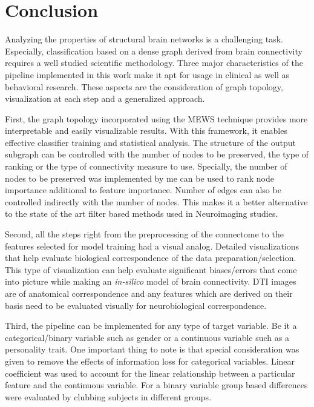 \documentclass[msthesis.tex]{subfiles}
\begin{document}
\chapter{Conclusion}
\iffalse
Interpretability-accuracy tradeoff. 
With the solver - 42 features (10 nodes)
with the baseline - much more number of nodes for the same features.
\fi
Analyzing the properties of structural brain networks is a challenging task. Especially, classification based on a dense graph derived from brain connectivity requires a well studied scientific methodology. Three major characteristics of the pipeline implemented in this work make it apt for usage in clinical as well as behavioral research. These aspects are the consideration of graph topology, visualization at each step and a generalized approach. 

First, the graph topology incorporated using the MEWS technique provides more interpretable and easily visualizable results. With this framework, it enables effective classifier training and statistical analysis. The structure of the output subgraph can be controlled with the number of nodes to be preserved, the type of ranking or the type of connectivity measure to use. Specially, the number of nodes to be preserved was implemented by me can be used to rank node importance additional to feature importance. Number of edges can also be controlled indirectly with the number of nodes. This makes it a better alternative to the state of the art filter based methods used in Neuroimaging studies. 

Second, all the steps right from the preprocessing of the connectome to the features selected for model training had a visual analog. Detailed visualizations that help evaluate biological correspondence of the data preparation/selection. This type of visualization can help evaluate significant biases/errors that come into picture while making an \textit{in-silico} model of brain connectivity. DTI images are of anatomical correspondence and any features which are derived on their basis need to be evaluated visually for neurobiological correspondence. 

Third, the pipeline can be implemented for any type of target variable. Be it a categorical/binary variable such as gender or a continuous variable such as a personality trait. One important thing to note is that special consideration was given to remove the effects of information loss for categorical variables. Linear coefficient was used to account for the linear relationship between a particular feature and the continuous variable. For a binary variable group based differences were evaluated by clubbing subjects in different groups. 
\end{document}
